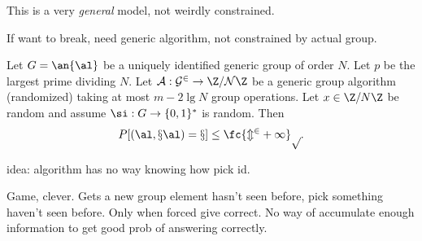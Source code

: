 This is a very {\it general} model, not weirdly constrained.

If want to break, need generic algorithm, not constrained by actual group.

\begin{thm}
Let $G=\an{\al}$ be a uniquely identified generic group of order $N$. Let $p$ be the largest prime dividing $N$. Let $\cal A:G^2\to \Z/N\Z$ be a generic group algorithm (randomized) taking at most $m-2\lg N$ group operations. Let $x\in \Z/N\Z$ be random and assume $\si:G\to \{0,1\}^*$ is random. Then
\[
P[\cal (\al,x\al)=x]\le \fc{m^2+1}p.
\]
\end{thm}
idea: algorithm has no way knowing how pick id.

Game, clever. Gets a new group element hasn't seen before, pick something haven't seen before. Only when forced give correct. No way of accumulate enough information to get good prob of answering correctly.
%
